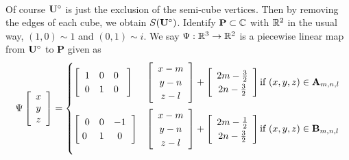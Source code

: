 \documentclass[a4paper, 11pt]{article}
\begin{document}
\\
Of course $\mathbf{U}^\circ$ is just the exclusion of the semi-cube vertices. Then by removing the edges of each cube, we obtain $S(\mathbf{U}^\circ)$. Identify $\mathbf{P}\subset\mathbb{C}$ with $\mathbb{R}^2$ in the usual way, $(1,0)\sim 1$ and $(0,1)\sim i$. We say $\Psi:\mathbb{R}^3\rightarrow\mathbb{R}^2$ is a piecewise linear map from $\mathbf{U}^\circ$ to $\mathbf{P}$ given as
\begin{equation}
\Psi\left[\begin{array}{c}
	x\\y\\z
\end{array}\right] 
= 
\begin{cases}
	\left[ \hspace{2mm} \begin{matrix}
		1 & 0 & 0 \\
		0 & 1 & 0 \\
	\end{matrix}\hspace{3mm}\right]

	&\left[\begin{array}{c}
	x - m
	\\ y- n
	\\ z - l
	\end{array} \right]
	+
	\left[\begin{array}{c}
		2m - \frac{3}{2}
		\\ 2n - \frac{3}{2}
	\end{array} \right]
		\text{if } (x,y,z)\in \mathbf{A}_{m,n,l}	\vspace{2mm}
	\\
		
		
	\left[ \begin{matrix} \hspace{2mm}
	0 & 0 & -1 \\
	0 & 1 & 0 
	\end{matrix}\hspace{2mm}\right]
	&\left[\begin{array}{c}
		x - m
		\\ y- n
		\\ z - l
		\end{array} \right]
	+
		\left[\begin{array}{c}
			2m - \frac{1}{2}
			\\ 2n - \frac{3}{2}
		\end{array} \right]
		 \text{if } (x,y,z)\in \mathbf{B}_{m,n,l}	\vspace{2mm}
	\\
	

\end{cases}
\end{equation}
\end{document}
